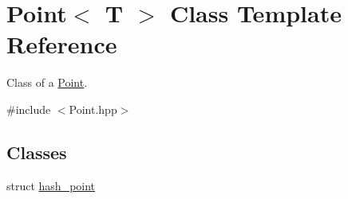 \hypertarget{classPoint}{}\section{Point$<$ T $>$ Class Template Reference}
\label{classPoint}


Class of a \hyperlink{classPoint}{Point}.  




{\ttfamily \#include $<$Point.\+hpp$>$}

\subsection*{Classes}
\begin{DoxyCompactItemize}
\item 
struct \hyperlink{structPoint_1_1hash__point}{hash\+\_\+point}
\end{DoxyCompactItemize}

